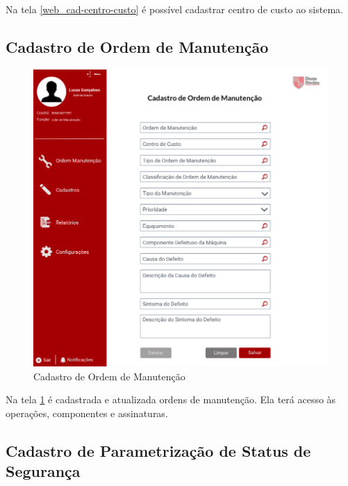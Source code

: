 Na tela \ref{web_cad-centro-custo} é possível cadastrar centro de custo ao sistema.

\newpage
\subsection{Cadastro de Ordem de Manutenção}

\begin{figure}[htb]
	\caption{\label{web_cad-om}Cadastro de Ordem de Manutenção}
	\begin{center}
		\includegraphics[scale=0.65]{./Figuras/web/cad-om.png}
	\end{center}
\end{figure}

Na tela \ref{web_cad-om} é cadastrada e atualizada ordens de manutenção. Ela terá acesso às operações, componentes e assinaturas.

\newpage
\subsection{Cadastro de Parametrização de Status de Segurança}

